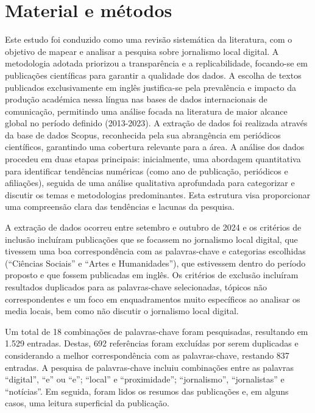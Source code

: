 \documentclass[portuguese]{textolivre}
\begin{document}
\section{Material e métodos}

Este estudo foi conduzido como uma revisão sistemática da literatura, com o objetivo de mapear e analisar a pesquisa sobre jornalismo local digital. A metodologia adotada priorizou a transparência e a replicabilidade, focando-se em publicações científicas para garantir a qualidade dos dados. A escolha de textos publicados exclusivamente em inglês justifica-se pela prevalência e impacto da produção académica nessa língua nas bases de dados internacionais de comunicação, permitindo uma análise focada na literatura de maior alcance global no período definido (2013-2023). A extração de dados foi realizada através da base de dados Scopus, reconhecida pela sua abrangência em periódicos científicos, garantindo uma cobertura relevante para a área. A análise dos dados procedeu em duas etapas principais: inicialmente, uma abordagem quantitativa para identificar tendências numéricas (como ano de publicação, periódicos e afiliações), seguida de uma análise qualitativa aprofundada para categorizar e discutir os temas e metodologias predominantes. Esta estrutura visa proporcionar uma compreensão clara das tendências e lacunas da pesquisa.

A extração de dados ocorreu entre setembro e outubro de 2024 e os critérios de inclusão incluíram publicações que se focassem no jornalismo local digital, que tivessem uma boa correspondência com as palavras-chave e categorias escolhidas (“Ciências Sociais” e “Artes e Humanidades”), que estivessem dentro do período proposto e que fossem publicadas em inglês. Os critérios de exclusão incluíram resultados duplicados para as palavras-chave selecionadas, tópicos não correspondentes e um foco em enquadramentos muito específicos ao analisar os media locais, bem como não discutir o jornalismo local digital.

Um total de 18 combinações de palavras-chave foram pesquisadas, resultando em 1.529 entradas. Destas, 692 referências foram excluídas por serem duplicadas e considerando a melhor correspondência com as palavras-chave, restando 837 entradas. A pesquisa de palavras-chave incluiu combinações entre as palavras “digital”, “e” ou “e”; “local” e “proximidade”; “jornalismo”, “jornalistas” e “notícias”. Em seguida, foram lidos os resumos das publicações e, em alguns casos, uma leitura superficial da publicação.
\end{document}
